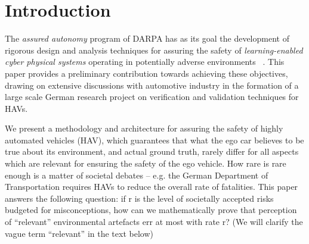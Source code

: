 \section{Introduction}

The \emph{assured autonomy} program of DARPA has as its goal the development of rigorous design and analysis techniques for assuring the safety of \emph{learning-enabled cyber physical systems} operating in potentially adverse environments ~\cite{AssuredAutonomy}. This paper provides a preliminary contribution towards achieving these objectives, drawing on extensive discussions with automotive industry \cite{galbas,reco} in the formation of a large scale German research project on verification and validation techniques for HAVs. 

We present a methodology and architecture for assuring the safety of highly automated vehicles (HAV), which guarantees  that what the ego car believes to be true about its environment, and actual ground truth, rarely differ for all aspects which are relevant for ensuring the safety of the ego vehicle. How rare is rare enough is a matter of societal debates -- e.g. the German Department of Transportation requires HAVs to reduce the overall rate of fatalities. This paper answers the following question: if  r  is the level of societally accepted risks budgeted for misconceptions, how can we mathematically prove that perception of \enquote{relevant} environmental artefacts err at most with rate r? (We will clarify the vague term \enquote{relevant} in the text below)

